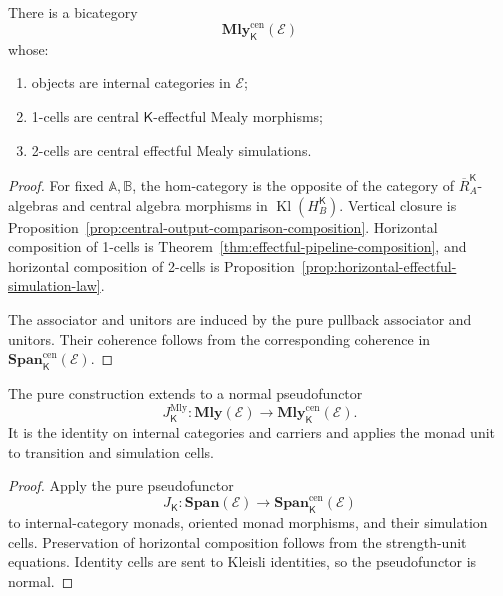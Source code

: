 \begin{theorem}
\label{thm:central-effectful-mealy-bicategory}
There is a bicategory
\[
    \mathbf{Mly}^{\mathrm{cen}}_{\mathsf K}(\mathcal E)
\]
whose:
\begin{enumerate}
    \item objects are internal categories in \(\mathcal E\);

    \item 1-cells are central \(\mathsf K\)-effectful Mealy morphisms;

    \item 2-cells are central effectful Mealy simulations.
\end{enumerate}
\end{theorem}

\begin{proof}
For fixed \(\mathbb A,\mathbb B\), the hom-category is the opposite of the
category of \(\overline R_A^{\mathsf K}\)-algebras and central algebra
morphisms in \(\operatorname{Kl}(H_B^{\mathsf K})\).  Vertical closure is
Proposition~\ref{prop:central-output-comparison-composition}.  Horizontal
composition of 1-cells is
Theorem~\ref{thm:effectful-pipeline-composition}, and horizontal composition
of 2-cells is
Proposition~\ref{prop:horizontal-effectful-simulation-law}.

The associator and unitors are induced by the pure pullback associator and
unitors.  Their coherence follows from the corresponding coherence in
\(\mathbf{Span}^{\mathrm{cen}}_{\mathsf K}(\mathcal E)\).
\end{proof}

\begin{theorem}
\label{thm:deterministic-effectful-pseudofunctor}
The pure construction extends to a normal pseudofunctor
\[
    J_{\mathsf K}^{\mathrm{Mly}}:
    \mathbf{Mly}(\mathcal E)
    \longrightarrow
    \mathbf{Mly}^{\mathrm{cen}}_{\mathsf K}(\mathcal E).
\]
It is the identity on internal categories and carriers and applies the monad
unit to transition and simulation cells.
\end{theorem}

\begin{proof}
Apply the pure pseudofunctor
\[
    J_{\mathsf K}:
    \mathbf{Span}(\mathcal E)
    \to
    \mathbf{Span}^{\mathrm{cen}}_{\mathsf K}(\mathcal E)
\]
to internal-category monads, oriented monad morphisms, and their simulation
cells.  Preservation of horizontal composition follows from the
strength-unit equations.  Identity cells are sent to Kleisli identities, so
the pseudofunctor is normal.
\end{proof}

